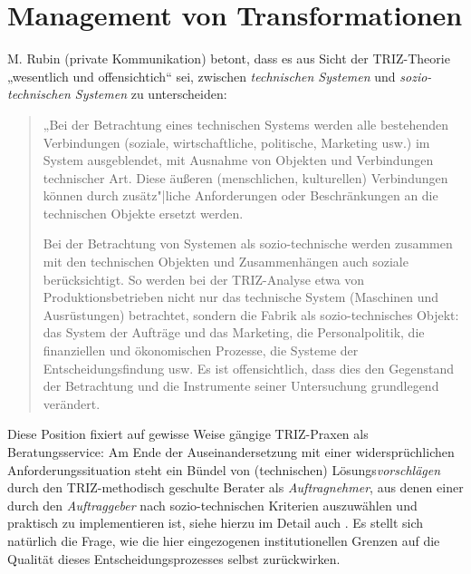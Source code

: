 \documentclass[12pt,a4paper]{article}
\begin{document}
\section{Management von Transformationen}

M. Rubin (private Kommunikation) betont, dass es aus Sicht der TRIZ-Theorie
„wesentlich und offensichtich“ sei, zwischen \emph{technischen Systemen} und
\emph{sozio-technischen Systemen} zu unterscheiden:
\begin{quote}
  „Bei der Betrachtung eines technischen Systems werden alle bestehenden
  Verbindungen (soziale, wirtschaftliche, politische, Marketing usw.) im
  System ausgeblendet, mit Ausnahme von Objekten und Verbindungen technischer
  Art. Diese äußeren (menschlichen, kulturellen) Verbindungen können durch
  zusätz"|liche Anforderungen oder Beschränkungen an die technischen Objekte
  ersetzt werden.\par Bei der Betrachtung von Systemen als sozio-technische
  werden zusammen mit den technischen Objekten und Zusammenhängen auch soziale
  berücksichtigt.  So werden bei der TRIZ-Analyse etwa von
  Produktionsbetrieben nicht nur das technische System (Maschinen und
  Ausrüstungen) betrachtet, sondern die Fabrik als sozio-technisches Objekt:
  das System der Aufträge und das Marketing, die Personalpolitik, die
  finanziellen und ökonomischen Prozesse, die Systeme der Entscheidungsfindung
  usw.  Es ist offensichtlich, dass dies den Gegenstand der Betrachtung und
  die Instrumente seiner Untersuchung grundlegend verändert.
\end{quote}
\newpage

Diese Position fixiert auf gewisse Weise gängige TRIZ-Praxen als
Beratungsservice: Am Ende der Auseinandersetzung mit einer widersprüchlichen
Anforderungssituation steht ein Bündel von (technischen)
Lösungs\emph{vorschlägen} durch den TRIZ-methodisch geschulte Berater als
\emph{Auftragnehmer}, aus denen einer durch den \emph{Auftraggeber} nach
sozio-technischen Kriterien auszuwählen und praktisch zu implementieren ist,
siehe hierzu im Detail auch \cite{Kozhemyako2019}.  Es stellt sich natürlich
die Frage, wie die hier eingezogenen institutionellen Grenzen auf die Qualität
dieses Entscheidungsprozesses selbst zurückwirken.
\end{document}
